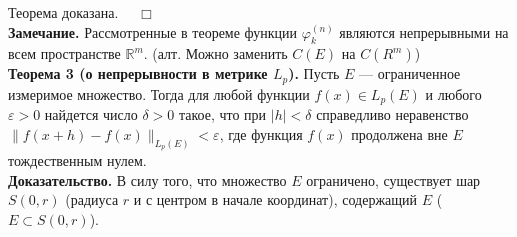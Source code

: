 \documentclass[12pt,a4paper, titlepage]{article}
\begin{document}
Теорема доказана. $\quad \Box$\\

\textbf{Замечание.} Рассмотренные в теореме функции $\varphi_k^{(n)}$ являются непрерывными на всем пространстве $\mathbb R^m$. (алт. Можно заменить $C(E)$ на $C(R^m)$)\\

\textbf{Теорема 3 (о непрерывности в метрике $L_p$).} Пусть $E$ --- ограниченное измеримое множество. Тогда для любой функции $f(x) \in L_p(E)$ и любого $\varepsilon > 0$ найдется число $\delta > 0$ такое, что при $|h| < \delta$ справедливо неравенство
$\|f(x+h) - f(x)\|_{L_p(E)} < \varepsilon$, где функция $f(x)$ продолжена вне $E$ тождественным нулем.\\
\textbf{Доказательство.} В силу того, что множество $E$ ограничено, существует шар $S(0, r)$ (радиуса $r$ и с центром в начале координат), содержащий $E$ ($E \subset S(0, r)$).\\
\end{document}
